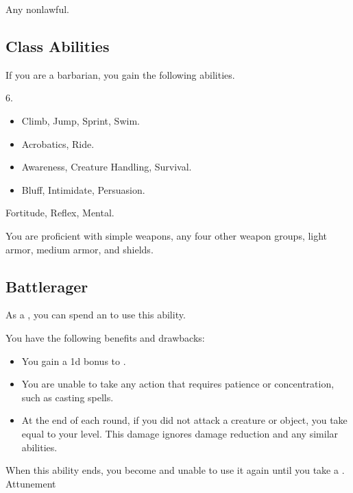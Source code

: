      Any nonlawful.

    \subsection{Class Abilities}
        If you are a barbarian, you gain the following abilities.

         6.

        \begin{itemize}
            \item {} Climb, Jump, Sprint, Swim.
            \item {} Acrobatics, Ride.
            \item {} Awareness, Creature Handling, Survival.
            \item {} Bluff, Intimidate, Persuasion.
        \end{itemize}

          Fortitude,  Reflex,  Mental.

        You are proficient with simple weapons, any four other weapon groups, light armor, medium armor, and shields.

    \subsection{Battlerager}\label{Rage}

        As a , you can spend an  to use this ability.
        \begin{ability}
            \begin{spelleffects}
                \spelleffect You have the following benefits and drawbacks:
                \begin{itemize}
                    \item You gain a \plus1d bonus to .
                    \item You are unable to take any action that requires patience or concentration, such as casting spells.
                    \item At the end of each round, if you did not attack a creature or object, you take  equal to your level.
                        This damage ignores damage reduction and any similar abilities.
                \end{itemize}
                \spellspecial When this ability ends, you become \fatigued and unable to use it again until you take a .
                \spelldur Attunement
            \end{spelleffects}
        \end{ability}


